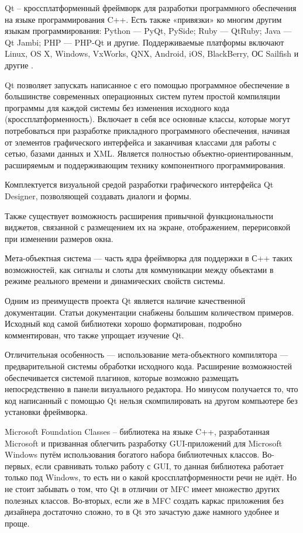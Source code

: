 Qt – кроссплатформенный фреймворк для разработки программного обеспечения на языке программирования C++. Есть также «привязки» ко многим другим языкам программирования: Python — PyQt, PySide; Ruby — QtRuby; Java — Qt Jambi; PHP — PHP-Qt и другие. Поддерживаемые платформы включают Linux, OS X, Windows, VxWorks, QNX, Android, iOS, BlackBerry, ОС Sailfish и другие \cite{Qt}.

Qt позволяет запускать написанное с его помощью программное обеспечение в большинстве современных операционных систем путем простой компиляции программы для каждой системы без изменения исходного кода (кроссплатформенность). Включает в себя все основные классы, которые могут потребоваться при разработке прикладного программного обеспечения, начиная от элементов графического интерфейса и заканчивая классами для работы с сетью, базами данных и XML. Является полностью объектно-ориентированным, расширяемым и поддерживающим технику компонентного программирования.

Комплектуется визуальной средой разработки графического интерфейса Qt Designer, позволяющей создавать диалоги и формы.

Также существует возможность расширения привычной функциональности виджетов, связанной с размещением их на экране, отображением, перерисовкой при изменении размеров окна.

Мета-объектная система — часть ядра фреймворка для поддержки в С++ таких возможностей, как сигналы и слоты для коммуникации между объектами в режиме реального времени и динамических свойств системы.

Одним из преимуществ проекта Qt является наличие качественной документации. Статьи документации снабжены большим количеством примеров. Исходный код самой библиотеки хорошо форматирован, подробно комментирован, что также упрощает изучение Qt.

Отличительная особенность — использование мета-объектного компилятора — предварительной системы обработки исходного кода. Расширение возможностей обеспечивается системой плагинов, которые возможно размещать непосредственно в панели визуального редактора. Но минусом получается то, что код написанный с помощью Qt нельзя скомпилировать на другом компьютере без установки фреймворка.

Microsoft Foundation Classes – библиотека на языке C++, разработанная Microsoft и призванная облегчить разработку GUI-приложений для Microsoft Windows путём использования богатого набора библиотечных классов.
Во-первых, если сравнивать только работу с GUI, то данная библиотека работает только под Windows, то есть ни о какой кроссплатформенности речи не идёт. Но не стоит забывать о том, что Qt в отличии от MFC имеет множество других полезных классов. Во-вторых, если же в MFC создать каркас приложения без дизайнера достаточно сложно, то в Qt это зачастую даже намного удобнее и проще.


